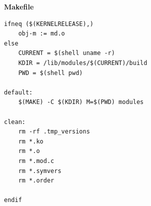 \documentclass[a4paper,14pt]{extreport} %
\begin{document}
\textbf{Makefile}

\begin{lstlisting}
ifneq ($(KERNELRELEASE),)
	obj-m := md.o
else
	CURRENT = $(shell uname -r)
	KDIR = /lib/modules/$(CURRENT)/build
	PWD = $(shell pwd)

default:
	$(MAKE) -C $(KDIR) M=$(PWD) modules

clean:
	rm -rf .tmp_versions
	rm *.ko
	rm *.o
	rm *.mod.c
	rm *.symvers
	rm *.order

endif
\end{lstlisting}
\end{document}
